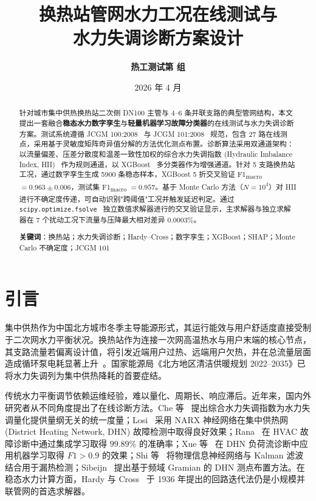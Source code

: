 \documentclass[11pt,a4paper]{ctexart}
\title{\textbf{换热站管网水力工况在线测试与\\水力失调诊断方案设计}}
\author[1]{\textbf{热工测试第 \underline{\hspace{1.5em}} 组}}
\affil[1]{湖南大学能源与动力工程专业\quad 热工测试与控制技术课程}
\date{2026 年 4 月}
\begin{document}
\maketitle

\begin{abstract}
\noindent 针对城市集中供热换热站二次侧 DN100 主管与 4--6 条并联支路的典型管网结构，本文提出一套融合\textbf{稳态水力数字孪生}与\textbf{轻量机器学习故障分类器}的在线测试与水力失调诊断方案。测试系统遵循 JCGM 100:2008~\cite{gum100} 与 JCGM 101:2008~\cite{gum101} 规范，包含 27 路在线测点，采用基于灵敏度矩阵奇异值分解的方法优化测点布置。诊断算法采用双通道架构：以流量偏差、压差分散度和温差一致性加权的综合水力失调指数 (Hydraulic Imbalance Index, HII)~\cite{che2023} 作为规则通道，以 XGBoost~\cite{chen2016xgboost} 多分类器作为增强通道。针对 5 支路换热站工况，通过数字孪生生成 5900 条稳态样本，XGBoost 5 折交叉验证 F1\textsubscript{macro} $=0.963\pm0.006$，测试集 F1\textsubscript{macro} $=0.957$。基于 Monte Carlo 方法（$N=10^4$）对 HII 进行不确定度传递，可自动识别"跨阈值"工况并触发延迟判定。通过 \texttt{scipy.optimize.fsolve}~\cite{virtanen2020scipy} 独立数值求解器进行的交叉验证显示，主求解器与独立求解器在 7 个扰动工况下流量与压降最大相对差异 $0.0003\%$。
\vspace{0.6em}
\par\noindent\textbf{关键词}：换热站；水力失调诊断；Hardy--Cross；数字孪生；XGBoost；SHAP；Monte Carlo 不确定度；JCGM 101
\end{abstract}

\section{引言}\label{sec:intro}
集中供热作为中国北方城市冬季主导能源形式，其运行能效与用户舒适度直接受制于二次网水力平衡状况。换热站作为连接一次网高温热水与用户末端的核心节点，其支路流量若偏离设计值，将引发近端用户过热、远端用户欠热，并在总流量层面造成循环泵电耗显著上升~\cite{gb50736}。国家能源局《北方地区清洁供暖规划 2022--2035》已将水力失调列为集中供热降耗的首要症结。

传统水力平衡调节依赖运维经验，难以量化、周期长、响应滞后。近年来，国内外研究者从不同角度提出了在线诊断方法。Che 等~\cite{che2023} 提出综合水力失调指数为水力失调量化提供量纲无关的统一度量；Losi~\cite{losi2024} 采用 NARX 神经网络在集中供热网 (District Heating Network, DHN) 故障检测中取得良好效果；Rana~\cite{rana2025} 在 HVAC 故障诊断中通过集成学习取得 $99.89\%$ 的准确率；Xue 等~\cite{xue2020} 在 DHN 负荷流诊断中应用机器学习取得 $F1>0.9$ 的效果；Shi 等~\cite{shi2025} 将物理信息神经网络与 Kalman 滤波结合用于漏热检测；Sibeijn~\cite{sibeijn2025} 提出基于频域 Gramian 的 DHN 测点布置方法。在稳态水力计算方面，Hardy 与 Cross~\cite{cross1936} 于 1936 年提出的回路迭代法仍是小规模并联管网的首选求解器。
\end{document}
